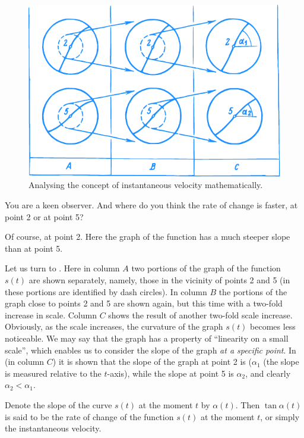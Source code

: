 {\begin{figure}[!ht]%
\centering
\includegraphics[width=\textwidth]{figures/fig-32.pdf}
\caption{Analysing the concept of instantaneous velocity mathematically.}
\label{fig-32}
\end{figure}

\athr You are a keen observer. And where do you think the rate of change is faster, at point 2 or at point 5? 

\rdr Of course, at point 2. Here the graph of the function has a much steeper slope than at point 5.	

\athr Let us turn to . Here in column $A$ two portions of the graph of the function $s (t)$ are shown separately, namely, those in the vicinity of points 2 and 5 (in  these portions are identified by dash circles). In column $B$ the portions of the graph close to points 2 and 5 are shown again, but this time with a two-fold increase in scale. Column $C$ shows the result of another two-fold scale increase. Obviously, as the scale increases, the curvature of the graph $s (t)$ becomes less noticeable. We may say that the graph has a property of ``linearity on a small scale'', which enables us to consider the slope of the graph \emph{at a specific point}. In  (in column $C$) it is shown that the slope of the graph at point 2 is ($\alpha_{1}$ (the slope is measured relative to the $t$-axis), while the slope at point 5 is $\alpha_{2}$, and
clearly $\alpha_{2} < \alpha_{1}$.

Denote the slope of the curve $s (t)$ at the moment $t$ by $\alpha (t)$. Then $\tan \alpha (t)$ is said to be the rate of change of the function $s (t)$ at the moment $t$, or simply the instantaneous velocity.

}
